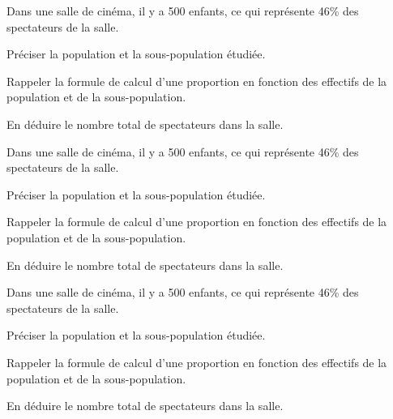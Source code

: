 \documentclass{exos}
\begin{document}
\begin{exercize*}
Dans une salle de cinéma, il y a \num{500} enfants, ce qui représente \num{46}\% des spectateurs de la salle.
\begin{alphaquestions}
\item Préciser la population et la sous-population étudiée.
\item Rappeler la formule de calcul d'une proportion en fonction des effectifs de la population et de la sous-population.
\item En déduire le nombre total de spectateurs dans la salle.
\end{alphaquestions}
\end{exercize*}
\vspace*{3cm}
\begin{exercize*}
Dans une salle de cinéma, il y a \num{500} enfants, ce qui représente \num{46}\% des spectateurs de la salle.
\begin{alphaquestions}
\item Préciser la population et la sous-population étudiée.
\item Rappeler la formule de calcul d'une proportion en fonction des effectifs de la population et de la sous-population.
\item En déduire le nombre total de spectateurs dans la salle.
\end{alphaquestions}
\end{exercize*}
\vspace*{3cm}
\begin{exercize*}
Dans une salle de cinéma, il y a \num{500} enfants, ce qui représente \num{46}\% des spectateurs de la salle.
\begin{alphaquestions}
\item Préciser la population et la sous-population étudiée.
\item Rappeler la formule de calcul d'une proportion en fonction des effectifs de la population et de la sous-population.
\item En déduire le nombre total de spectateurs dans la salle.
\end{alphaquestions}
\end{exercize*}
\vspace*{3cm}
\end{document}
